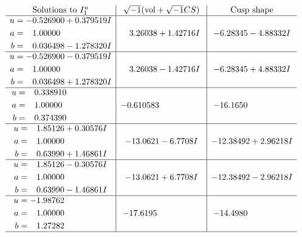 \documentclass[1p]{elsarticle_modified}
\theoremstyle{definition}
\newcommand{\I}{\sqrt{-1}}
\begin{document}
$$\begin{array}{c|c|c}  
\text{Solutions to }I^u_{1}& \I (\text{vol} + \sqrt{-1}CS) & \text{Cusp shape}\\
 \hline 
\begin{aligned}
u &= -0.526900 + 0.379519 I \\
a &= \phantom{-}1.00000\phantom{ +0.000000I} \\
b &= \phantom{-}0.036498 - 1.278320 I\end{aligned}
 & \phantom{-}3.26038 + 1.42716 I & -6.28345 - 4.88332 I \\ \hline\begin{aligned}
u &= -0.526900 - 0.379519 I \\
a &= \phantom{-}1.00000\phantom{ +0.000000I} \\
b &= \phantom{-}0.036498 + 1.278320 I\end{aligned}
 & \phantom{-}3.26038 - 1.42716 I & -6.28345 + 4.88332 I \\ \hline\begin{aligned}
u &= \phantom{-}0.338910\phantom{ +0.000000I} \\
a &= \phantom{-}1.00000\phantom{ +0.000000I} \\
b &= \phantom{-}0.374390\phantom{ +0.000000I}\end{aligned}
 & -0.610583\phantom{ +0.000000I} & -16.1650\phantom{ +0.000000I} \\ \hline\begin{aligned}
u &= \phantom{-}1.85126 + 0.30576 I \\
a &= \phantom{-}1.00000\phantom{ +0.000000I} \\
b &= \phantom{-}0.63990 + 1.46861 I\end{aligned}
 & -13.0621 - 6.7708 I & -12.38492 + 2.96218 I \\ \hline\begin{aligned}
u &= \phantom{-}1.85126 - 0.30576 I \\
a &= \phantom{-}1.00000\phantom{ +0.000000I} \\
b &= \phantom{-}0.63990 - 1.46861 I\end{aligned}
 & -13.0621 + 6.7708 I & -12.38492 - 2.96218 I \\ \hline\begin{aligned}
u &= -1.98762\phantom{ +0.000000I} \\
a &= \phantom{-}1.00000\phantom{ +0.000000I} \\
b &= \phantom{-}1.27282\phantom{ +0.000000I}\end{aligned}
 & -17.6195\phantom{ +0.000000I} & -14.4980\phantom{ +0.000000I}\\
 \hline 
 \end{array}$$\newpage\newpage\renewcommand{\arraystretch}{1}
\end{document}
